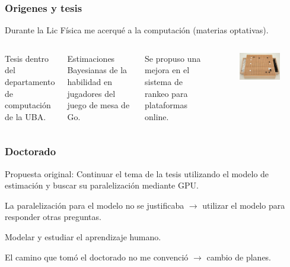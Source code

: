 \documentclass[10pt]{beamer}
\begin{document}
\begin{frame}
\frametitle{Origenes y tesis}

 Durante la Lic Física me acerqué a la computación (materias optativas).
\begin{columns}
\vspace{0.5cm}

Tesis dentro del departamento de computación de la UBA.
\vspace{0.5cm}

Estimaciones Bayesianas de la habilidad en jugadores del juego de mesa de Go.

\vspace{0.5cm}
Se propuso una mejora en el sistema de rankeo para plataformas online.
\begin{figure}[h!]
    \centering
    \includegraphics[scale=2.]{go.jpg}
\end{figure}
\end{columns}
\end{frame}

\begin{frame}
\frametitle{Doctorado}
Propuesta original: Continuar el tema de la tesis utilizando el modelo de estimación y buscar su paralelización mediante GPU.

La paralelización para el modelo no se justificaba $\rightarrow$ utilizar el modelo para responder otras preguntas.

Modelar y estudiar el aprendizaje humano.

El camino que tomó el doctorado  no me convenció $\to$ cambio de planes.



\end{frame}
\end{document}
